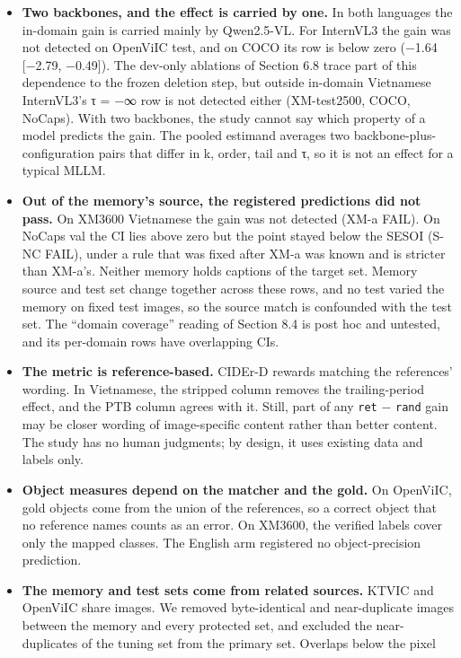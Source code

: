 \begin{itemize}
\tightlist
\item
  \textbf{Two backbones, and the effect is carried by one.} In both languages the in-domain gain is
  carried mainly by Qwen2.5-VL. For InternVL3 the gain was not detected on OpenViIC test, and on
  COCO its row is below zero (−1.64 {[}−2.79, −0.49{]}). The dev-only ablations of Section 6.8 trace
  part of this dependence to the frozen deletion step, but outside in-domain Vietnamese InternVL3's
  τ = −∞ row is not detected either (XM-test2500, COCO, NoCaps). With two backbones, the study
  cannot say which property of a model predicts the gain. The pooled estimand averages two
  backbone-plus-configuration pairs that differ in k, order, tail and τ, so it is not an effect for
  a typical MLLM.
\item
  \textbf{Out of the memory's source, the registered predictions did not pass.} On XM3600 Vietnamese
  the gain was not detected (XM-a FAIL). On NoCaps val the CI lies above zero but the point stayed
  below the SESOI (S-NC FAIL), under a rule that was fixed after XM-a was known and is stricter than
  XM-a's. Neither memory holds captions of the target set. Memory source and test set change
  together across these rows, and no test varied the memory on fixed test images, so the source
  match is confounded with the test set. The ``domain coverage'' reading of Section 8.4 is post hoc
  and untested, and its per-domain rows have overlapping CIs.
\item
  \textbf{The metric is reference-based.} CIDEr-D rewards matching the references' wording. In
  Vietnamese, the stripped column removes the trailing-period effect, and the PTB column agrees with
  it. Still, part of any \texttt{ret} − \texttt{rand} gain may be closer wording of image-specific
  content rather than better content. The study has no human judgments; by design, it uses existing
  data and labels only.
\item
  \textbf{Object measures depend on the matcher and the gold.} On OpenViIC, gold objects come from
  the union of the references, so a correct object that no reference names counts as an error. On
  XM3600, the verified labels cover only the mapped classes. The English arm registered no
  object-precision prediction.
\item
  \textbf{The memory and test sets come from related sources.} KTVIC and OpenViIC share images. We
  removed byte-identical and near-duplicate images between the memory and every protected set, and
  excluded the near-duplicates of the tuning set from the primary set. Overlaps below the pixel

\end{itemize}
